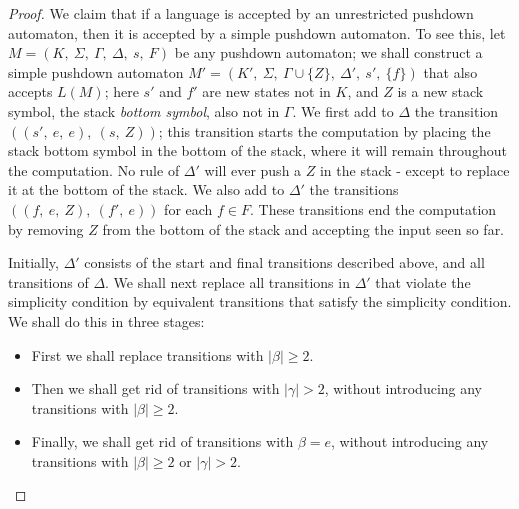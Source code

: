 \begin{multicols*}{2}
\begin{proof}
  We claim that if a language is accepted by an unrestricted pushdown automaton, then it is accepted by a simple pushdown automaton. To see this, let $M = (K,\ \Sigma,\ \Gamma,\ \Delta,\ s,\ F)$ be any pushdown automaton; we shall construct a simple pushdown automaton $M' = (K',\ \Sigma,\ \Gamma \cup \{ Z \},\ \Delta',\ s',\ \{ f \})$ that also accepts $L(M)$; here $s'$ and $f'$ are new states not in $K$, and $Z$ is a new stack symbol, the stack \textit{bottom symbol}, also not in $\Gamma$. We first add to $\Delta$ the transition $(( s',\ e,\ e),\ (s,\ Z))$; this transition starts the computation by placing the stack bottom symbol in the bottom of the stack, where it will remain throughout the computation. No rule of $\Delta'$ will ever push a $Z$ in the stack - except to replace it at the bottom of the stack. We also add to $\Delta'$ the transitions $((f,\ e,\ Z),\ (f',\ e))$ for each $f \in F$. These transitions end the computation by removing $Z$ from the bottom of the
  stack and accepting the input seen so far.

  Initially, $\Delta'$ consists of the start and final transitions described above, and all transitions of $\Delta$. We shall next replace all transitions in $\Delta'$ that violate the simplicity condition by equivalent transitions that satisfy the simplicity condition. We shall do this in three stages:
  \begin{itemize}
    \item First we shall replace transitions with $|\beta| \geq 2$.
    \item Then we shall get rid of transitions with $|\gamma| > 2$, without introducing any transitions with $|\beta| \geq 2$.
    \item Finally, we shall get rid of transitions with $\beta = e$, without introducing any transitions with $|\beta| \geq 2$ or $|\gamma| > 2$.
  \end{itemize}

  
\end{proof}





\end{multicols*}